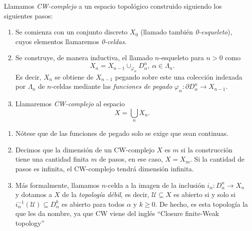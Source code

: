 \begin{definition}
    Llamamos \textit{CW-complejo} a un espacio topológico construido siguiendo los siguientes pasos:

        \begin{enumerate}[label=(\roman*)]
            \item Se comienza con un conjunto discreto $ X_0 $ (llamado también \textit{0-esqueleto}), cuyos elementos llamaremos \textit{0-celdas}.
            
            \item Se construye, de manera inductiva, el llamado $ n $-esqueleto para $n>0$ como
            \begin{equation*}
                X_n = X_{n-1}\cup_{\varphi_{\alpha}}D^n_{\alpha},~\alpha\in \Lambda_n.
            \end{equation*}
            Es decir, $X_n$ se obtiene de $X_{n-1}$ pegando sobre este una colección indexada por $\Lambda_n$ de $n$-celdas mediante las \textit{funciones de pegado} $\varphi_{\alpha} : \partial D^n_{\alpha} \to X_{n-1}$.
            
            \item Llamaremos \textit{CW-complejo} al espacio 
            \begin{equation*}
                X = \bigcup_{n} X_n.    
            \end{equation*}
        \end{enumerate} 
\end{definition}

\bigskip

\begin{remark} \hfill
    \begin{enumerate}
        \item Nótese que de las funciones de pegado solo se exige que sean continuas.
        \item Decimos que la dimensión de un CW-complejo $X$ es $m$ si la construcción tiene una cantidad finita $m$ de pasos, en ese caso, $X=X_m$. Si la cantidad de pasos es infinita, el CW-complejo tendrá dimensión infinita. 
        \item Más formalmente, llamamos $n$-celda a la imagen de la inclusión $i_{\alpha}: D^n_{\alpha}\to X_n$ y dotamos a $X$ de la \textit{topología débil}, es decir, $\mathcal{U}\subseteq X$ es abierto si y solo si $i^{-1}_{\alpha}(\mathcal{U})\subseteq D^k_{\alpha}$ es abierto para todos $\alpha$ y $k\ge 0$. De hecho, es esta topología la que les da nombre, ya que CW viene del inglés ``Closure finite-Weak topology''
    \end{enumerate}
\end{remark}

